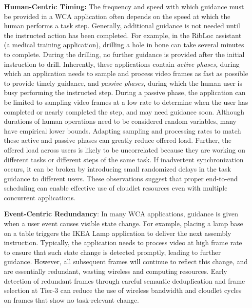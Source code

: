 \textbf{Human-Centric Timing:} The frequency and speed with which
guidance must be provided in a WCA application often depends on the
speed at which the human performs a task step.  Generally, additional
guidance is not needed until the instructed action has been completed.
For example, in the RibLoc assistant (a medical training application),
drilling a hole in bone can take several minutes to complete.  During
the drilling, no further guidance is provided after the initial
instruction to drill.  Inherently, these applications contain {\em
  active phases,} during which an application needs to sample and
process video frames as fast as possible to provide timely guidance,
and {\em passive phases,} during which the human user is busy
performing the instructed step.  During a passive phase, the
application can be limited to sampling video frames at a low rate to
determine when the user has completed or nearly completed the step,
and may need guidance soon.  Although durations of human operations
need to be considered random variables, many have empirical lower
bounds.  Adapting sampling and processing rates to match these active
and passive phases can greatly reduce offered load.  Further, the
offered load across users is likely to be uncorrelated because they
are working on different tasks or different steps of the same task.
If inadvertent synchronization occurs, it can be broken by introducing
small randomized delays in the task guidance to different users.
These observations suggest that proper end-to-end scheduling can
enable effective use of cloudlet resources even with multiple
concurrent applications.

\textbf{Event-Centric Redundancy}: In many WCA applications, guidance
is given when a user event causes visible state change. For example,
placing a lamp base on a table triggers the IKEA Lamp application to
deliver the next assembly instruction.  Typically, the application
needs to process video at high frame rate to ensure that such state
change is detected promptly, leading to further guidance.  However,
all subsequent frames will continue to reflect this change, and are
essentially redundant, wasting wireless and computing resources.
Early detection of redundant frames through careful semantic
deduplication and frame selection at Tier-3 can reduce the use of
wireless bandwidth and cloudlet cycles on frames that show no
task-relevant change.

